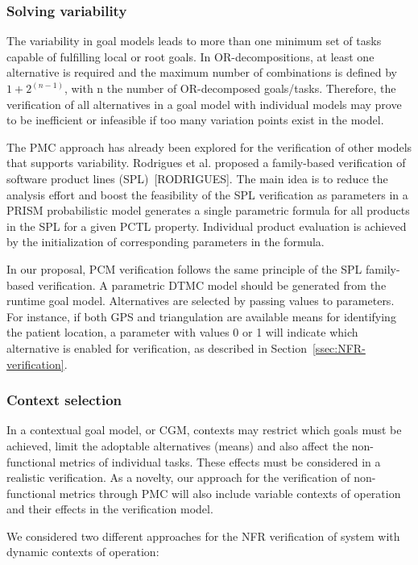 \subsubsection{Solving variability}

The variability in goal models leads to more than one minimum set of tasks capable of fulfilling local or root goals. In OR-decompositions, at least one alternative is required and the maximum number of combinations is defined by $1 + 2^{(n-1)}$, with n the number of OR-decomposed goals/tasks. Therefore, the verification of all alternatives in a goal model with individual models may prove to be inefficient or infeasible if too many variation points exist in the model.

The PMC approach has already been explored for the verification of other models that supports variability. Rodrigues et al. proposed a family-based verification of software product lines (SPL)~[RODRIGUES]. The main idea is to reduce the analysis effort and boost the feasibility of the SPL verification as parameters in a PRISM probabilistic model generates a single parametric formula for all products in the SPL for a given PCTL property. Individual product evaluation is achieved by the initialization of corresponding parameters in the formula. 

In our proposal, PCM verification follows the same principle of the SPL family-based verification. A parametric DTMC model should be generated from the runtime goal model. Alternatives are selected by passing values to parameters. For instance, if both GPS and triangulation are available means for identifying the patient location, a parameter with values 0 or 1 will indicate which alternative is enabled for verification, as described in Section~\ref{ssec:NFR-verification}.

\subsubsection{Context selection}

In a contextual goal model, or CGM, contexts may restrict which goals must be achieved, limit the adoptable alternatives (means) and also affect the non-functional metrics of individual tasks. These effects must be considered in a realistic verification. As a novelty, our approach for the verification of non-functional metrics through PMC will also include variable contexts of operation and their effects in the verification model. 

We considered two different approaches for the NFR verification of system with dynamic contexts of operation:

